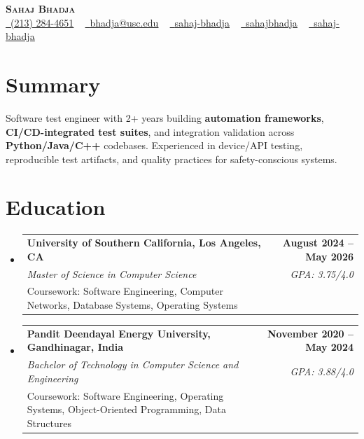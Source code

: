 \documentclass[letterpaper,10pt]{article}
\makeatletter
\newcommand{\resumeEduSubheading}[5]{\vspace{-1pt}\item\begin{tabular*}{1.0\textwidth}[t]{l@{\extracolsep{\fill}}r}\textbf{#1} & \textbf{\small #2} \\\textit{\small #3} & \textit{\small #4} \\\small #5 & \\\end{tabular*}\vspace{-4pt}}
\newcommand{\resumeSubHeadingListStart}{\begin{itemize}[leftmargin=0.0in, label={}]}
\newcommand{\resumeSubHeadingListEnd}{\end{itemize}}
\makeatother
\begin{document}
\begin{center}
{\Huge \scshape \textbf{Sahaj Bhadja}} \\ \vspace{1pt}
\small \href{tel:(213) 284-4651}{\faPhone\ \underline{(213) 284-4651}} ~ \href{mailto:bhadja@usc.edu}{\raisebox{-0.2\height}\faEnvelope\ \underline{bhadja@usc.edu}} ~
\href{https://www.linkedin.com/in/sahaj-bhadja/}{\raisebox{-0.2\height}\faLinkedin\ \underline{sahaj-bhadja}} ~ \href{https://github.com/SAHAJ-BHADJA}{\raisebox{-0.2\height}\faGithub\ \underline{sahajbhadja}} ~
\href{https://sahaj-bhadja.vercel.app/}{\raisebox{-0.2\height}\faGlobe\ \underline{sahaj-bhadja}}
\end{center}
\vspace{-18pt}
\section{Summary}
\begin{itemize}[leftmargin=0.15in, label={}]
\small{\item{Software test engineer with 2+ years building \textbf{automation frameworks}, \textbf{CI/CD-integrated test suites}, and integration validation across \textbf{Python/Java/C++} codebases. Experienced in device/API testing, reproducible test artifacts, and quality practices for safety-conscious systems.}}
\end{itemize}
\vspace{-16pt}
\section{Education}
\resumeSubHeadingListStart
\resumeEduSubheading{University of Southern California, Los Angeles, CA}{August 2024 -- May 2026}{Master of Science in Computer Science}{GPA: 3.75/4.0}{Coursework: Software Engineering, Computer Networks, Database Systems, Operating Systems}
\vspace{-9pt}
\resumeEduSubheading{Pandit Deendayal Energy University, Gandhinagar, India}{November 2020 -- May 2024}{Bachelor of Technology in Computer Science and Engineering}{GPA: 3.88/4.0}{Coursework: Software Engineering, Operating Systems, Object-Oriented Programming, Data Structures}
\resumeSubHeadingListEnd
\vspace{-14pt}
\end{document}
